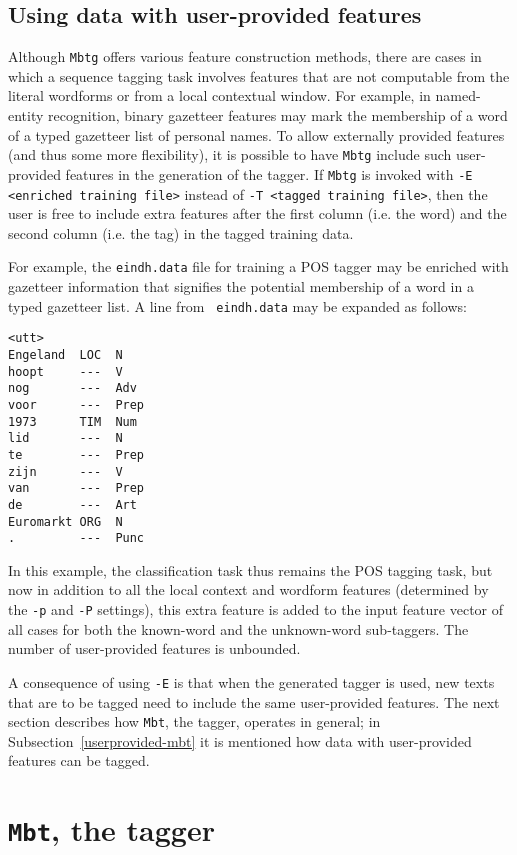 \documentclass{report}
\begin{document}
\subsection{Using data with user-provided features}
\label{userprovided-mbtg}

Although {\tt Mbtg} offers various feature construction methods, there
are cases in which a sequence tagging task involves features that are
not computable from the literal wordforms or from a local contextual
window. For example, in named-entity recognition, binary gazetteer
features may mark the membership of a word of a typed gazetteer list
of personal names. To allow externally provided features (and thus
some more flexibility), it is possible to have {\tt Mbtg} include such
user-provided features in the generation of the tagger. If {\tt Mbtg}
is invoked with {\tt -E <enriched training file>} instead of {\tt -T
  <tagged training file>}, then the user is free to include extra
features after the first column (i.e. the word) and the second column
(i.e. the tag) in the tagged training data.

For example, the {\tt eindh.data} file for training a POS tagger may
be enriched with gazetteer information that signifies the potential
membership of a word in a typed gazetteer list. A line from {\tt
  eindh.data} may be expanded as follows:

{\small
\begin{verbatim}
<utt>
Engeland  LOC  N
hoopt     ---  V
nog       ---  Adv
voor      ---  Prep
1973      TIM  Num
lid       ---  N
te        ---  Prep
zijn      ---  V
van       ---  Prep
de        ---  Art
Euromarkt ORG  N
.         ---  Punc
\end{verbatim}
}

In this example, the classification task thus remains the POS tagging
task, but now in addition to all the local context and wordform
features (determined by the {\tt -p} and {\tt -P} settings), this
extra feature is added to the input feature vector of all cases for
both the known-word and the unknown-word sub-taggers. The number of
user-provided features is unbounded.

A consequence of using {\tt -E} is that when the generated tagger is
used, new texts that are to be tagged need to include the same
user-provided features. The next section describes how {\tt Mbt}, the
tagger, operates in general; in Subsection~\ref{userprovided-mbt} it
is mentioned how data with user-provided features can be tagged.

\section{{\tt Mbt}, the tagger}
\end{document}
